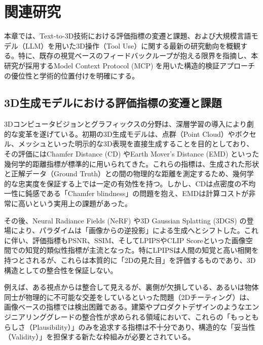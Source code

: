 \documentclass{deimj}
\begin{document}
\section{関連研究}

本章では、Text-to-3D技術における評価指標の変遷と課題、および大規模言語モデル（LLM）を用いた3D操作（Tool Use）に関する最新の研究動向を概観する。特に、既存の視覚ベースのフィードバックループが抱える限界を指摘し、本研究が採用するModel Context Protocol (MCP) を用いた構造的検証アプローチの優位性と学術的位置付けを明確にする。

\subsection{3D生成モデルにおける評価指標の変遷と課題}

3Dコンピュータビジョンとグラフィックスの分野は、深層学習の導入により劇的な変革を遂げている。初期の3D生成モデルは、点群（Point Cloud）やボクセル、メッシュといった明示的な3D表現を直接生成することを目的としており、その評価にはChamfer Distance (CD) やEarth Mover's Distance (EMD) といった幾何学的距離指標が標準的に用いられてきた\cite{fan2017point,nichol2022point}。これらの指標は、生成された形状と正解データ（Ground Truth）との間の物理的な距離を測定するため、幾何学的な忠実度を保証する上では一定の有効性を持つ。しかし、CDは点密度の不均一性に鈍感である「Chamfer blindness」の問題を抱え、EMDは計算コストが非常に高いという実用上の課題があった。

その後、Neural Radiance Fields (NeRF)\cite{mildenhall2020nerf} や3D Gaussian Splatting (3DGS)\cite{kerbl20233dgs} の登場により、パラダイムは「画像からの逆投影」による生成へとシフトした。これに伴い、評価指標もPSNR、SSIM、そしてLPIPS\cite{zhang2018lpips}やCLIP Score\cite{radford2021clip}といった画像空間での知覚的類似性指標が主流となった。特にLPIPSは人間の知覚と高い相関を持つとされるが、これらは本質的に「2Dの見た目」を評価するものであり、3D構造としての整合性を保証しない。

例えば、ある視点からは整合して見えるが、裏側が欠損している、あるいは物体同士が物理的に不可能な交差をしているといった問題（2Dチーティング）は、画像ベースの指標では検出困難である\cite{poole2022dreamfusion}。建築やプロダクトデザインのようなエンジニアリンググレードの整合性が求められる領域において、これらの「もっともらしさ（Plausibility）」のみを追求する指標は不十分であり、構造的な「妥当性（Validity）」を担保する新たな枠組みが必要とされている。
\end{document}
